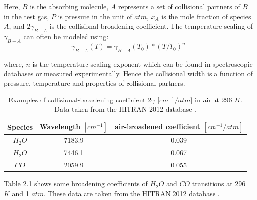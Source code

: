\noindent Here, $B$ is the absorbing molecule, $A$ represents a set of collisional partners of $B$ in the test gas, $P$ is pressure in the unit of $atm$, $x_A$ is the mole fraction of species $A$, and $2\gamma_{B-A}$ is the collisional-broadening coefficient. The temperature scaling of $\gamma_{B-A}$ can often be modeled using:
\begin{equation}\label{}
\gamma_{B-A}(T)=\gamma_{B-A}(T_0)*(T/T_0)^{n}
\end{equation}

\noindent where, $n$ is the temperature scaling exponent which can be found in spectroscopic databases or measured experimentally. Hence the collisional width is a function of pressure, temperature and properties of collisional partners.

\vspace{2mm}

\begin{table}[h]
\begin{center}
\begin{tabular}{ c c c }
\hline
Species & Wavelength $[cm^{-1}]$ & air-broadened coefficient $[cm^{-1}/atm]$\\ \hline
$H_2O$ & 7183.9 & 0.039\\ 
$H_2O$ & 7446.1 & 0.067\\ 
$CO$ & 2059.9 & 0.055\\ \hline
\end{tabular}
\caption{Examples of collisional-broadening coefficient 2$\gamma$ [$cm^{-1}/atm$] in air at 296 $K$. Data taken from the HITRAN 2012 database \cite{2013JQSRT.130....4R}.}
\label{table:ch2_1}
\end{center}
\end{table}

\vspace{-5mm}

Table 2.1 shows some broadening coefficients of $H_2O$ and $CO$ transitions at 296 $K$ and 1 $atm$. These data are taken from the HITRAN 2012 database \cite{2013JQSRT.130....4R}.



